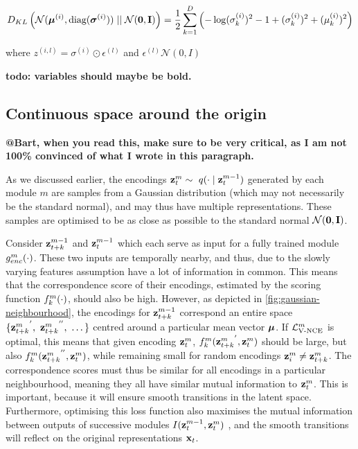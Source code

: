 		\begin{equation} %
			\kl{\normal}{\standardnormal} = \latentspaceconstraintclosedform
		\end{equation}
		
		
		where $z^(i,l) = \sigma ^{(i)} \odot \epsilon^{(l)}$ and $\epsilon^(l) \mathcal{N}(0, I)$
		
		\textbf{todo: variables should maybe be bold.}
		
		
	
	
	\subsection{Continuous space around the origin} \label{cha:contin_space}
		\textbf{@Bart, when you read this, make sure to be very critical, as I am not 100\% convinced of what I wrote in this paragraph.}
		
		
			As we discussed earlier, the encodings $\mathbf{z}_t^m \sim ~ q(\cdot \mid \mathbf{z}_t^{m-1})$ generated by each module $m$ are samples from a Gaussian distribution (which may not necessarily be the standard normal), and may thus have multiple representations. These samples are optimised to be as close as possible to the standard normal $\mathcal{N}(\bm{\mathbf{0}}, \mathbf{I})$. 
	
			Consider $\mathbf{z}_{t+k}^{m-1}$ and $\mathbf{z}_t^{m-1}$ which each serve as input for a fully trained module $g_{enc}^m(\cdot)$. These two inputs are temporally nearby, and thus, due to the slowly varying features assumption \cite{zhangSlowFeatureAnalysis2012} have a lot of information in common. This means that the correspondence score of their encodings, estimated by the scoring function $f_k^m(\cdot)$, should also be high. However, as depicted in \ref{fig:gaussian-neighbourhood}, the encodings for $\mathbf{z}_{t+k}^{m-1}$ correspond an entire space $ \{ {\mathbf{z}_{t+k}^m}^{'},~{\mathbf{z}_{t+k}^m}^{''},~\dots \}$ centred around a particular mean vector $\bm{\mu}$. If $\mathcal{L}_{\text{V-NCE}}^m$ is optimal, this means that given encoding $\mathbf{z}_t^m$, $f_k^m({\mathbf{z}_{t+k}^m}^{'}, {\mathbf{z}_t^m})$ should be  large, but also $f_k^m({\mathbf{z}_{t+k}^m}^{''}, {\mathbf{z}_t^m})$, while remaining small for random encodings $\mathbf{z}_i^m \neq \mathbf{z}_{t+k}^m$. The correspondence scores must thus be similar for all encodings in a particular neighbourhood, meaning they all have similar mutual information to $\mathbf{z}_t^{m}$. This is important, because it will ensure smooth transitions in the latent space. Furthermore, optimising this loss function also maximises the mutual information between outputs of successive modules $I(\mathbf{z}_t^{m-1}, \mathbf{z}_t^{m})$ \cite{lowePuttingEndEndtoEnd2020}, and the smooth transitions will reflect on the original representations $\mathbf{x}_t$.			 
		
